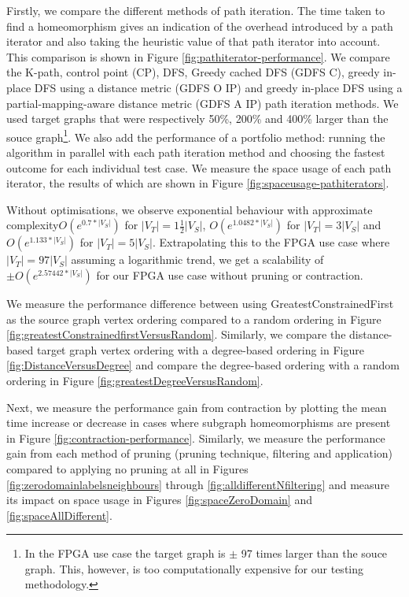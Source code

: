 Firstly, we compare the different methods of path iteration. The time taken to find a homeomorphism gives an indication of the overhead introduced by a path iterator and also taking the heuristic value of that path iterator into account. This comparison is shown in Figure \ref{fig:pathiterator-performance}. We compare the K-path, control point (CP), DFS, Greedy cached DFS (GDFS C), greedy in-place DFS using a distance metric (GDFS O IP) and greedy in-place DFS using a partial-mapping-aware distance metric (GDFS A IP) path iteration methods. We used target graphs that were respectively 50\%, 200\% and 400\% larger than the souce graph\footnote{In the FPGA use case the target graph is $\pm$ 97 times larger than the souce graph. This, however, is too computationally expensive for our testing methodology.}. We also add the performance of a portfolio method: running the algorithm in parallel with each path iteration method and choosing the fastest outcome for each individual test case. We measure the space usage of each path iterator, the results of which are shown in Figure \ref{fig:spaceusage-pathiterators}.

Without optimisations, we observe exponential behaviour with approximate complexity$O(e^{0.7*|V_S|})$ for $|V_T|=1\frac{1}{2}|V_S|$, $O(e^{1.0482*|V_S|})$ for $|V_T|=3|V_S|$ and $O(e^{1.133*|V_S|})$ for $|V_T|=5|V_S|$. Extrapolating this to the FPGA use case where $|V_T|=97|V_S|$ assuming a logarithmic trend, we get a scalability of $\pm O(e^{2.57442*|V_S|})$ for our FPGA use case without pruning or contraction.

We measure the performance difference between using GreatestConstrainedFirst as the source graph vertex ordering compared to a random ordering in Figure \ref{fig:greatestConstrainedfirstVersusRandom}. Similarly, we compare the distance-based target graph vertex ordering with a degree-based ordering in Figure \ref{fig:DistanceVersusDegree} and compare the degree-based ordering with a random ordering in Figure \ref{fig:greatestDegreeVersusRandom}.

Next, we measure the performance gain from contraction by plotting the mean time increase or decrease in cases where subgraph homeomorphisms are present in Figure \ref{fig:contraction-performance}. Similarly, we measure the performance gain from each method of pruning (pruning technique, filtering and application) compared to applying no pruning at all in Figures \ref{fig:zerodomainlabelsneighbours} through \ref{fig:alldifferentNfiltering} and measure its impact on space usage in Figures \ref{fig:spaceZeroDomain} and \ref{fig:spaceAllDifferent}.

